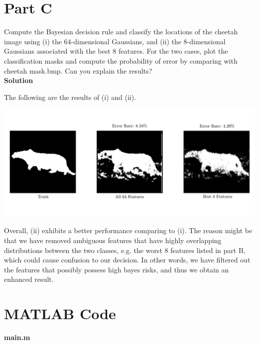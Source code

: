 \documentclass{article}
\begin{document}
\pagebreak

\section*{Part C}

Compute the Bayesian decision rule and classify the locations of the cheetah image using (i) the 64-dimensional Gaussians, and (ii) the 8-dimensional Gaussians associated with the best 8 features. For the two cases, plot the classification masks and compute the probability of error by comparing with cheetah mask.bmp. Can you explain the results? \\

\textbf{\large Solution}

The following are the results of (i) and (ii).
\begin{center}
  \includegraphics[width=\textwidth]{result}
\end{center}

Overall, (ii) exhibits a better performance comparing to (i). The reason might be that we have removed ambiguous features that have highly overlapping distributions between the two classes, e.g. the worst 8 features listed in part B, which could cause confusion to our decision. In other words, we have filtered out the features that possibly possess high bayes risks, and thus we obtain an enhanced result.

\pagebreak

\section*{MATLAB Code}

\textbf{\large main.m}
\end{document}
